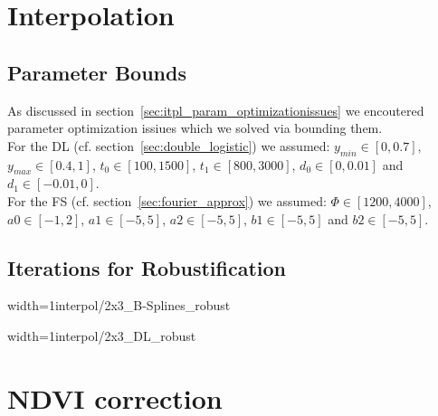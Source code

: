 \section{Interpolation}
	\subsection{Parameter Bounds} 
		As discussed in section~\ref{sec:itpl_param_optimizationissues} we encoutered parameter optimization issiues which we solved via bounding them. \\
		For the DL (cf. section~\ref{sec:double_logistic}) we assumed:  
		$y_{min} \in [0,0.7],$ 
		$y_{max} \in [0.4,1]$,
		$t_0 \in [100,1500]$,
		$t_1 \in [800,3000]$,
		$d_0 \in [0,0.01]$ and
		$d_1 \in [-0.01,0]$. 
		\\
		For the FS (cf. section~\ref{sec:fourier_approx}) we assumed: 
		$\Phi \in [1200,4000]$,
		$a0   \in [-1,2]$,
		$a1   \in [-5,5]$,
		$a2   \in [-5,5]$,
		$b1   \in [-5,5]$ and
		$b2   \in [-5,5]$.
	\subsection{Iterations for Robustification} 
\begin{my_figure}[H]{width=1\textwidth}{interpol/2x3_B-Splines_robust}
	\caption[B-splines robustification.]{B-splines \RobItPlot}
	\label{fig:interpol/2x3_B-Splines_robust}
\end{my_figure}

\begin{my_figure}[H]{width=1\textwidth}{interpol/2x3_DL_robust}
	\caption[A Double Logistic curve robustification.]{A Double Logistic curve \RobItPlot}
	\label{fig:interpol/2x3_DL_robust}
\end{my_figure}



\section{NDVI correction}



